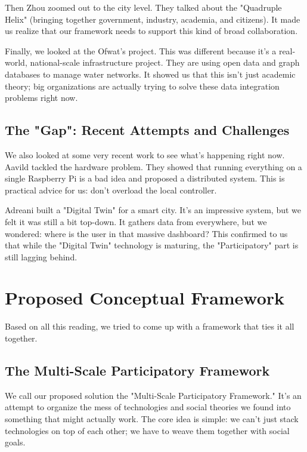 \documentclass[a4paper,oneside,12pt]{report}
\begin{document}
Then Zhou\cite{Zhou2024} zoomed out to the city level. They talked about the "Quadruple Helix" (bringing together government, industry, academia, and citizens). It made us realize that our framework needs to support this kind of broad collaboration.

Finally, we looked at the Ofwat's\cite{ThamesWater2024} project. This was different because it's a real-world, national-scale infrastructure project. They are using open data and graph databases to manage water networks. It showed us that this isn't just academic theory; big organizations are actually trying to solve these data integration problems right now.

\section{The "Gap": Recent Attempts and Challenges}
We also looked at some very recent work to see what's happening right now. Aavild\cite{Aavild2024} tackled the hardware problem. They showed that running everything on a single Raspberry Pi is a bad idea and proposed a distributed system. This is practical advice for us: don't overload the local controller.

Adreani\cite{Adreani2024} built a "Digital Twin" for a smart city. It's an impressive system, but we felt it was still a bit top-down. It gathers data from everywhere, but we wondered: where is the user in that massive dashboard? This confirmed to us that while the "Digital Twin" technology is maturing, the "Participatory" part is still lagging behind.

\chapter{Proposed Conceptual Framework}

Based on all this reading, we tried to come up with a framework that ties it all together.

\section{The Multi-Scale Participatory Framework}
We call our proposed solution the "Multi-Scale Participatory Framework." It's an attempt to organize the mess of technologies and social theories we found into something that might actually work. The core idea is simple: we can't just stack technologies on top of each other; we have to weave them together with social goals.
\end{document}
